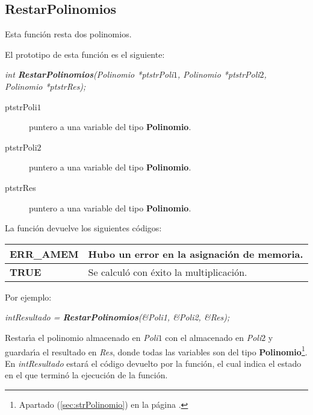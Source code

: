 \subsection{RestarPolinomios}

Esta funci\'on resta dos polinomios.\newline

El prototipo de esta funci\'on es el siguiente:

\begin{center}
\emph{int \textbf{RestarPolinomios}(Polinomio *ptstrPoli$1$,
Polinomio *ptstrPoli$2$, \\Polinomio *ptstrRes);}
\end{center}

\begin{description}
\item[ptstrPoli$1$] puntero a una variable del tipo \textbf{Polinomio}. 
\item[ptstrPoli$2$] puntero a una variable del tipo \textbf{Polinomio}. 
\item[ptstrRes] puntero a una variable del tipo \textbf{Polinomio}.
\end{description}

La funci\'on devuelve los siguientes c\'odigos:

\begin{center}
\begin{tabular}{|l|l|}
\hline
\textbf{ERR\_AMEM} & Hubo un error en la asignaci\'on de memoria. \\
\hline
\textbf{TRUE} & Se calcul\'o con \'exito la multiplicaci\'on. \\
\hline
\end{tabular}
\end{center}

Por ejemplo:

\begin{center}
\emph{intResultado = \textbf{RestarPolinomios}(\&Poli1, \&Poli2, \&Res);}
\end{center}

Restar\'{\i}a el polinomio almacenado en \emph{Poli$1$} con el almacenado
en \emph{Poli$2$} y guardar\'{\i}a el resultado en \emph{Res}, donde todas las
variables son del tipo \textbf{Polinomio}\footnote{Apartado 
(\ref{sec:strPolinomio}) en la p\'agina \pageref{sec:strPolinomio}.}.\\

En \emph{intResultado} estar\'a el c\'odigo devuelto por la funci\'on, el cual
indica el estado en el que termin\'o la ejecuci\'on de la funci\'on.\newline

